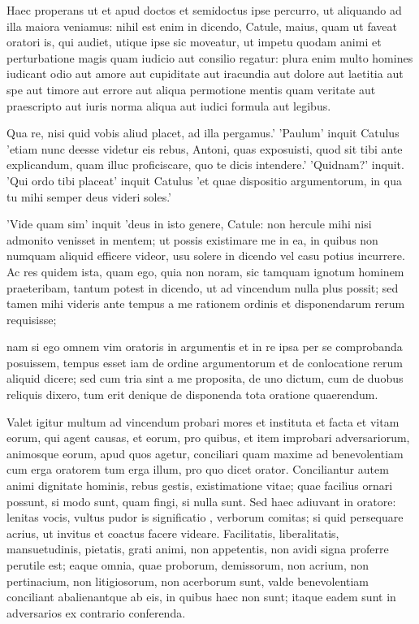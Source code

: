  Haec properans ut et apud doctos et semidoctus ipse percurro, ut aliquando ad illa maiora veniamus: nihil est enim in dicendo, Catule, maius, quam ut faveat oratori is, qui audiet, utique ipse sic moveatur, ut impetu quodam animi et perturbatione magis quam iudicio aut consilio regatur: plura enim multo homines iudicant odio aut amore aut cupiditate aut iracundia aut dolore aut laetitia aut spe aut timore aut errore aut aliqua permotione mentis quam veritate aut praescripto aut iuris norma aliqua aut iudici formula aut legibus.

 Qua re, nisi quid vobis aliud placet, ad illa pergamus.' 'Paulum' inquit Catulus 'etiam nunc deesse videtur eis rebus, Antoni, quas exposuisti, quod sit tibi ante explicandum, quam illuc proficiscare, quo te dicis intendere.' 'Quidnam?' inquit. 'Qui ordo tibi placeat' inquit Catulus 'et quae dispositio argumentorum, in qua tu mihi semper deus videri soles.'

 'Vide quam sim' inquit 'deus in isto genere, Catule: non hercule mihi nisi admonito venisset in mentem; ut possis existimare me in ea, in quibus non numquam aliquid efficere videor, usu solere in dicendo vel casu potius incurrere. Ac res quidem ista, quam ego, quia non noram, sic tamquam ignotum hominem praeteribam, tantum potest in dicendo, ut ad vincendum nulla plus possit; sed tamen mihi videris ante tempus a me rationem ordinis et disponendarum rerum requisisse;

 nam si ego omnem vim oratoris in argumentis et in re ipsa per se comprobanda posuissem, tempus esset iam de ordine argumentorum et de conlocatione rerum aliquid dicere; sed cum tria sint a me proposita, de uno dictum, cum de duobus reliquis dixero, tum erit denique de disponenda tota oratione quaerendum.

 Valet igitur multum ad vincendum probari mores et instituta et facta et vitam eorum, qui agent causas, et eorum, pro quibus, et item improbari adversariorum, animosque eorum, apud quos agetur, conciliari quam maxime ad benevolentiam cum erga oratorem tum erga illum, pro quo dicet orator. Conciliantur autem animi dignitate hominis, rebus gestis, existimatione vitae; quae facilius ornari possunt, si modo sunt, quam fingi, si nulla sunt. Sed haec adiuvant in oratore: lenitas vocis, vultus pudor is significatio , verborum comitas; si quid persequare acrius, ut invitus et coactus facere videare. Facilitatis, liberalitatis, mansuetudinis, pietatis, grati animi, non appetentis, non avidi signa proferre perutile est; eaque omnia, quae proborum, demissorum, non acrium, non pertinacium, non litigiosorum, non acerborum sunt, valde benevolentiam conciliant abalienantque ab eis, in quibus haec non sunt; itaque eadem sunt in adversarios ex contrario conferenda.

